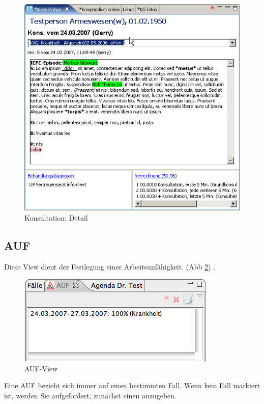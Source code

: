 \begin{figure}[htp]
\begin{center}
  \includegraphics{images/konsview}
  \caption{Konsultation: Detail}
  \label{fig:konsdetail}
\end{center}
\end{figure}

\subsection{AUF}
Diese View dient der Festlegung einer Arbeitsunfähigkeit. (Abb \ref{fig:auf})
 . %
\begin{figure}[htp]
\begin{center}
  \includegraphics{images/aufview}
  \caption{AUF-View}
  \label{fig:auf}
\end{center}
\end{figure}
Eine AUF bezieht sich immer auf einen bestimmten Fall. Wenn kein Fall markiert
ist, werden Sie aufgefordert, zunächst einen anzugeben.

